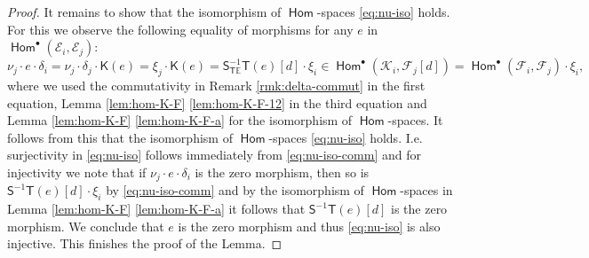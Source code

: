 \documentclass[a4paper,11pt, reqno]{amsart}
\def\E{\mathbb E}
\def\sE{\mathscr{E}}
\def\sF{\mathscr{F}}
\def\sK{\mathscr{K}}
\newcommand{\opname}[1]{\operatorname{\mathsf{#1}}}
\newcommand{\Hom}{\opname{Hom}}
\newcommand{\bK}{\mathsf{K}}
\newcommand{\bS}{\mathsf{S}}
\newcommand{\bT}{\mathsf{T}}
\theoremstyle{plain}
\theoremstyle{definition}
\numberwithin{equation}{section}
\begin{document}
\begin{proof}
It remains to show 
that the isomorphism of $\Hom$-spaces \eqref{eq:nu-iso} holds.
For this we observe the following equality of morphisms for any $e$ in $\Hom^\bullet ( \sE_i , \sE_j )$:
\begin{equation}\label{eq:nu-iso-comm}
    \nu_j \cdot  e \cdot \delta_i = \nu_j \cdot \delta_j \cdot \bK(e)= \xi_j \cdot \bK (e) =  \bS^{-1}_{\bT\E}  \bT (e) [d] \cdot \xi_i
    \in  \Hom^\bullet ( \sK_i  , \sF_j  [ d ] ) =\Hom^\bullet (\sF_i , \sF_j ) \cdot \xi_i ,
\end{equation}
where we used the commutativity in Remark \ref{rmk:delta-commut} in the first equation, Lemma \ref{lem:hom-K-F} \eqref{lem:hom-K-F-12} in the third equation and Lemma \ref{lem:hom-K-F} \eqref{lem:hom-K-F-a} for the isomorphism of $\Hom$-spaces.
It follows from this that the isomorphism of $\Hom$-spaces \eqref{eq:nu-iso} holds. 
I.e. surjectivity in \eqref{eq:nu-iso} follows immediately from \eqref{eq:nu-iso-comm} and for injectivity we note that if $\nu_j \cdot  e \cdot \delta_i$ is the zero morphism, then so is $\bS^{-1} \bT (e) [d] \cdot \xi_i$ by \eqref{eq:nu-iso-comm} and by the isomorphism of $\Hom$-spaces in Lemma \ref{lem:hom-K-F} \eqref{lem:hom-K-F-a} it follows that $\bS^{-1}\bT ( e ) [d]$ is the zero morphism.
We conclude that $e$ is the zero morphism and thus \eqref{eq:nu-iso} is also injective.
This finishes the proof of the Lemma.
\end{proof}
\end{document}
